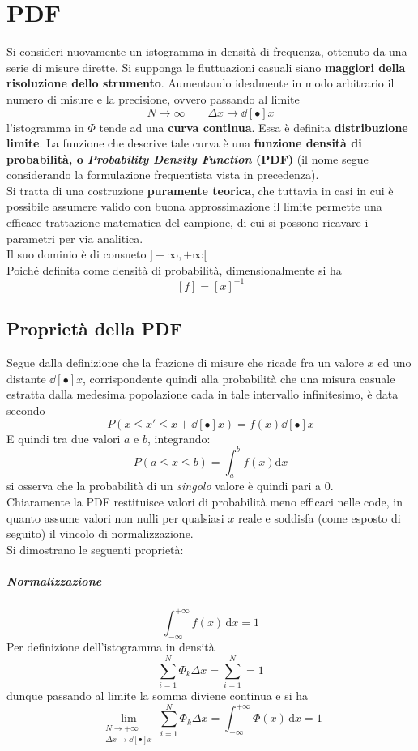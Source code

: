 \documentclass[10pt, oneside]{book}
\begin{document}
\chapter{PDF}
Si consideri nuovamente un istogramma in densità di frequenza, ottenuto da una serie di misure dirette. Si supponga le fluttuazioni casuali siano \textbf{maggiori della risoluzione dello strumento}. Aumentando idealmente in modo arbitrario il numero di misure e la precisione, ovvero passando al limite
\[N \rightarrow \infty \qquad \Delta x \rightarrow \dd[•]{x}\]
l'istogramma in $\Phi$ tende ad una \textbf{curva continua}. Essa è definita \textbf{distribuzione limite}. La funzione che descrive tale curva è una \textbf{funzione densità di probabilità, o \textit{Probability Density Function} (PDF)} (il nome segue considerando la formulazione frequentista vista in precedenza).\\
Si tratta di una costruzione \textbf{puramente teorica}, che tuttavia in casi in cui è possibile assumere valido con buona approssimazione il limite permette una efficace trattazione matematica del campione, di cui si possono ricavare i parametri per via analitica.\\
Il suo dominio è di consueto $]- \infty, + \infty[$\\
Poiché definita come densità di probabilità, dimensionalmente si ha
\[[f] = [x]^{-1}\]

\section{Proprietà della PDF}
Segue dalla definizione che la frazione di misure che ricade fra un valore $x$ ed uno distante $\dd[•]{x}$, corrispondente quindi alla probabilità che una misura casuale estratta dalla medesima popolazione cada in tale intervallo infinitesimo, è data secondo
\[P(x \leq x' \leq x + \dd[•]{x}) = f(x) \dd[•]{x}\]
E quindi tra due valori $a$ e $b$, integrando:
\[P(a \leq x \leq b) = \int_{a}^{b}f(x)\mathrm{d}x\]
si osserva che la probabilità di un \textit{singolo} valore è quindi pari a $0$.\\
Chiaramente la PDF restituisce valori di probabilità meno efficaci nelle code, in quanto assume valori non nulli per qualsiasi $x$ reale e soddisfa (come esposto di seguito) il vincolo di normalizzazione.\\
Si dimostrano le seguenti proprietà:
\paragraph{Normalizzazione}
\[\int_{-\infty}^{+\infty} f(x) \, \mathrm{d}x = 1\]
Per definizione dell'istogramma in densità
\[\sum\limits_{i=1}^N \Phi_k \Delta x = \sum\limits_{i=1}^N = 1\]
dunque passando al limite la somma diviene continua e si ha
\[\lim\limits_{\substack{N \rightarrow +\infty \\ \Delta x \rightarrow \dd[•]{x}}} \sum\limits_{i=1}^N \Phi_k \Delta x = \int_{-\infty}^{+\infty} \Phi(x) \, \mathrm{d}x = 1 \]
\end{document}
